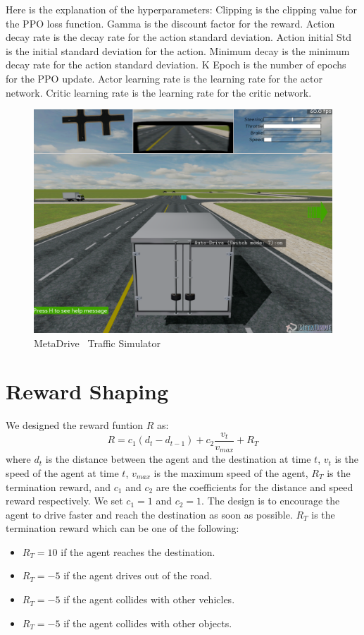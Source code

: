 Here is the explanation of the hyperparameters: Clipping is the clipping value for the PPO loss function.
Gamma is the discount factor for the reward.
Action decay rate is the decay rate for the action standard deviation.
Action initial Std is the initial standard deviation for the action.
Minimum decay is the minimum decay rate for the action standard deviation.
K Epoch is the number of epochs for the PPO update.
Actor learning rate is the learning rate for the actor network.
Critic learning rate is the learning rate for the critic network.

\begin{figure}[htbp]
    \centering
    \includegraphics[width=12cm]{assets/meta}
    \caption{MetaDrive~\cite{li2021metadrive} Traffic Simulator}
    \label{fig:metadrive}
\end{figure}



\section{Reward Shaping}\label{sec:reward-shaping}
We designed the reward funtion $R$ as:
\begin{equation}
    R = c_{1}(d_{t} - d_{t-1}) + c_{2}\frac{v_{t}}{v_{max}} + R_{T}
\end{equation}
where $d_{t}$ is the distance between the agent and the destination at time $t$, $v_{t}$ is the speed of the agent at time $t$, $v_{max}$ is the maximum speed of the agent, $R_{T}$ is the termination reward, and $c_{1}$ and $c_{2}$ are the coefficients for the distance and speed reward respectively.
We set $c_{1} = 1$ and $c_{2} = 1$.
The design is to encourage the agent to drive faster and reach the destination as soon as possible.
$R_{T}$ is the termination reward which can be one of the following:
\begin{itemize}
    \item $R_{T} = 10$ if the agent reaches the destination.
    \item $R_{T} = -5$ if the agent drives out of the road.
    \item $R_{T} = -5$ if the agent collides with other vehicles.
    \item $R_{T} = -5$ if the agent collides with other objects.
\end{itemize}

